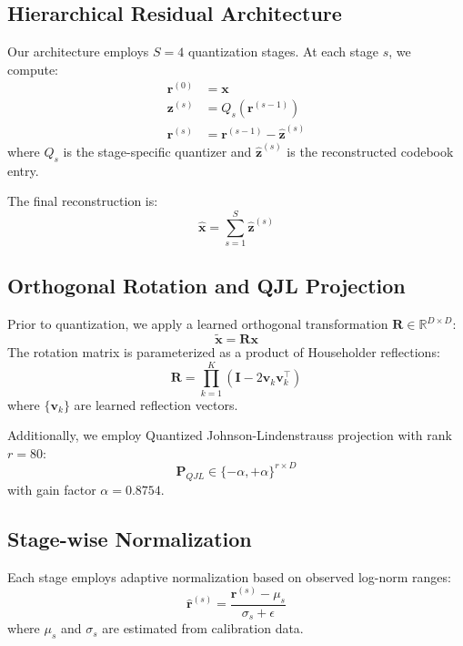 \documentclass[10pt,conference]{ieeeconf}
\begin{document}
\subsection{Hierarchical Residual Architecture}
Our architecture employs $S=4$ quantization stages. At each stage $s$, we compute:
\begin{align}
    \mathbf{r}^{(0)} &= \mathbf{x} \\
    \mathbf{z}^{(s)} &= Q_s(\mathbf{r}^{(s-1)}) \\
    \mathbf{r}^{(s)} &= \mathbf{r}^{(s-1)} - \hat{\mathbf{z}}^{(s)}
\end{align}
where $Q_s$ is the stage-specific quantizer and $\hat{\mathbf{z}}^{(s)}$ is the reconstructed codebook entry.

The final reconstruction is:
\begin{equation}
    \hat{\mathbf{x}} = \sum_{s=1}^{S} \hat{\mathbf{z}}^{(s)}
\end{equation}

\subsection{Orthogonal Rotation and QJL Projection}
Prior to quantization, we apply a learned orthogonal transformation $\mathbf{R} \in \mathbb{R}^{D \times D}$:
\begin{equation}
    \tilde{\mathbf{x}} = \mathbf{R}\mathbf{x}
\end{equation}
The rotation matrix is parameterized as a product of Householder reflections:
\begin{equation}
    \mathbf{R} = \prod_{k=1}^{K} (\mathbf{I} - 2\mathbf{v}_k\mathbf{v}_k^\top)
\end{equation}
where $\{\mathbf{v}_k\}$ are learned reflection vectors.

Additionally, we employ Quantized Johnson-Lindenstrauss projection with rank $r=80$:
\begin{equation}
    \mathbf{P}_{QJL} \in \{-\alpha, +\alpha\}^{r \times D}
\end{equation}
with gain factor $\alpha = 0.8754$.

\subsection{Stage-wise Normalization}
Each stage employs adaptive normalization based on observed log-norm ranges:
\begin{equation}
    \hat{\mathbf{r}}^{(s)} = \frac{\mathbf{r}^{(s)} - \mu_s}{\sigma_s + \epsilon}
\end{equation}
where $\mu_s$ and $\sigma_s$ are estimated from calibration data.
\end{document}
